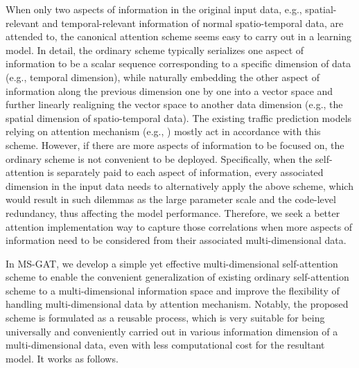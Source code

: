 When only two aspects of information in the original input data, e.g., spatial-relevant and temporal-relevant information of normal spatio-temporal data, are attended to, the canonical attention scheme seems easy to carry out in a learning model. In detail, the ordinary scheme typically serializes one aspect of information to be a scalar sequence corresponding to a specific dimension of data (e.g., temporal dimension), while naturally embedding the other aspect of information along the previous dimension one by one into a vector space and further linearly realigning the vector space to another data dimension (e.g., the spatial dimension of spatio-temporal data). The existing traffic prediction models relying on attention mechanism (e.g., \cite{guo2019attention,zheng2020gman}) mostly act in accordance with this scheme. However, if there are more aspects of information to be focused on, the ordinary scheme is not convenient to be deployed. Specifically, when the self-attention is separately paid to each aspect of information, every associated dimension in the input data needs to alternatively apply the above scheme, which would result in such dilemmas as the large parameter scale and the code-level redundancy, thus affecting the model performance. Therefore, we seek a better attention implementation way to capture those correlations when more aspects of information need to be considered from their associated multi-dimensional data.

In MS-GAT, we develop a simple yet effective multi-dimensional self-attention scheme to enable the convenient generalization of existing ordinary self-attention scheme to a multi-dimensional information space and improve the flexibility of handling multi-dimensional data by attention mechanism. Notably, the proposed scheme is formulated as a reusable process, which is very suitable for being universally and conveniently carried out in various information dimension of a multi-dimensional data, even with less computational cost for the resultant model. It works as follows.

